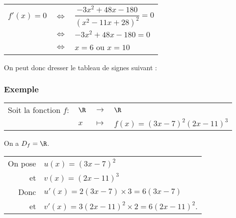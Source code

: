 \begin{tabular}{lll}
$f'(x) = 0$ & $\Longleftrightarrow$ & $\dfrac{-3x^2 + 48x - 180}{\left(x^2 - 11x + 28\right)^2} = 0$  \vspace*{.3cm} \\
& $\Longleftrightarrow$ & $-3x^2 + 48x - 180 = 0$ \vspace*{.3cm} \\
& $\Longleftrightarrow$ & $x = 6$ ou $x = 10$ \vspace*{.3cm} \\
\end{tabular}

On peut donc dresser le tableau de signes suivant :  \\


\vspace*{.3cm}

\newpage

\subsubsection{Exemple }

\begin{tabular}{llll}
Soit la fonction $f :$ & $\R$ & $\longrightarrow$ & $\R$ \\
& $x$ & $\longmapsto$ & $f(x) = \left(3x-7\right)^2\left(2x - 11\right)^3$ \\
\end{tabular}

\vspace*{.3cm}

On a $D_f = \R$. \\

\begin{tabular}{rl}
On pose & $u(x) = \left(3x - 7\right)^2$ \\
et & $v(x) = \left(2x - 11\right)^3$ \\
Donc & $u'(x) = 2\left(3x-7\right)\times 3 = 6\left(3x-7\right)$ \\
et & $v'(x) = 3\left(2x-11\right)^2\times 2 = 6\left(2x-11\right)^2$. \\
\end{tabular}

